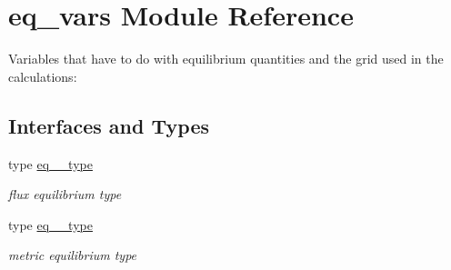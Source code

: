 \hypertarget{namespaceeq__vars}{}\section{eq\+\_\+vars Module Reference}
\label{namespaceeq__vars}


Variables that have to do with equilibrium quantities and the grid used in the calculations\+:  


\subsection*{Interfaces and Types}
\begin{DoxyCompactItemize}
\item 
type \hyperlink{structeq__vars_1_1eq__1__type}{eq\+\_\+\_\+type}
\begin{DoxyCompactList}\small\item\em flux equilibrium type \end{DoxyCompactList}\item 
type \hyperlink{structeq__vars_1_1eq__2__type}{eq\+\_\+\_\+type}
\begin{DoxyCompactList}\small\item\em metric equilibrium type \end{DoxyCompactList}\end{DoxyCompactItemize}

